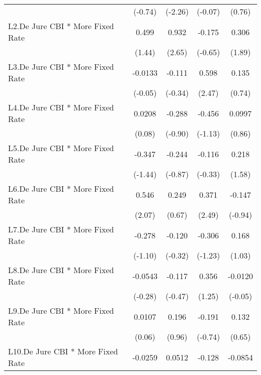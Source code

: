 {\begin{longtable}{l*{4}{c}}
                &  (-0.74)         &  (-2.26)         &  (-0.07)         &   (0.76)         \\
\addlinespace
L2.De Jure CBI * More Fixed Rate&    0.499         &    0.932\sym{**} &   -0.175         &    0.306         \\
                &   (1.44)         &   (2.65)         &  (-0.65)         &   (1.89)         \\
\addlinespace
L3.De Jure CBI * More Fixed Rate&  -0.0133         &   -0.111         &    0.598\sym{*}  &    0.135         \\
                &  (-0.05)         &  (-0.34)         &   (2.47)         &   (0.74)         \\
\addlinespace
L4.De Jure CBI * More Fixed Rate&   0.0208         &   -0.288         &   -0.456         &   0.0997         \\
                &   (0.08)         &  (-0.90)         &  (-1.13)         &   (0.86)         \\
\addlinespace
L5.De Jure CBI * More Fixed Rate&   -0.347         &   -0.244         &   -0.116         &    0.218         \\
                &  (-1.44)         &  (-0.87)         &  (-0.33)         &   (1.58)         \\
\addlinespace
L6.De Jure CBI * More Fixed Rate&    0.546\sym{*}  &    0.249         &    0.371\sym{*}  &   -0.147         \\
                &   (2.07)         &   (0.67)         &   (2.49)         &  (-0.94)         \\
\addlinespace
L7.De Jure CBI * More Fixed Rate&   -0.278         &   -0.120         &   -0.306         &    0.168         \\
                &  (-1.10)         &  (-0.32)         &  (-1.23)         &   (1.03)         \\
\addlinespace
L8.De Jure CBI * More Fixed Rate&  -0.0543         &   -0.117         &    0.356         &  -0.0120         \\
                &  (-0.28)         &  (-0.47)         &   (1.25)         &  (-0.05)         \\
\addlinespace
L9.De Jure CBI * More Fixed Rate&   0.0107         &    0.196         &   -0.191         &    0.132         \\
                &   (0.06)         &   (0.96)         &  (-0.74)         &   (0.65)         \\
\addlinespace
L10.De Jure CBI * More Fixed Rate&  -0.0259         &   0.0512         &   -0.128         &  -0.0854         \\

\end{longtable}}
